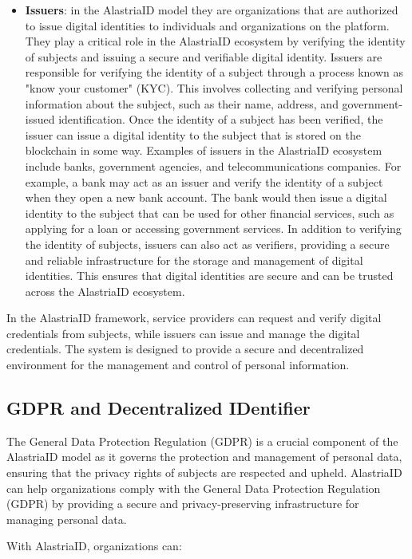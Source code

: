 \documentclass[target=mst,aauheader=]{thud}
\begin{document}
\begin{itemize}
    \item \textbf{Issuers}: in the AlastriaID model they are organizations that are authorized to issue digital identities to individuals and organizations on the platform. They play a critical role in the AlastriaID ecosystem by verifying the identity of subjects and issuing a secure and verifiable digital identity. Issuers are responsible for verifying the identity of a subject through a process known as "know your customer" (KYC). This involves collecting and verifying personal information about the subject, such as their name, address, and government-issued identification. Once the identity of a subject has been verified, the issuer can issue a digital identity to the subject that is stored on the blockchain in some way.
        Examples of issuers in the AlastriaID ecosystem include banks, government agencies, and telecommunications companies. For example, a bank may act as an issuer and verify the identity of a subject when they open a new bank account. The bank would then issue a digital identity to the subject that can be used for other financial services, such as applying for a loan or accessing government services. In addition to verifying the identity of subjects, issuers can also act as verifiers, providing a secure and reliable infrastructure for the storage and management of digital identities. This ensures that digital identities are secure and can be trusted across the AlastriaID ecosystem.
        
\end{itemize}

In the AlastriaID framework, service providers can request and verify digital credentials from subjects, while issuers can issue and manage the digital credentials. The system is designed to provide a secure and decentralized environment for the management and control of personal information.

\subsection{GDPR and Decentralized IDentifier}
The General Data Protection Regulation (GDPR) is a crucial component of the AlastriaID model as it governs the protection and management of personal data, ensuring that the privacy rights of subjects are respected and upheld.
AlastriaID can help organizations comply with the General Data Protection Regulation (GDPR) by providing a secure and privacy-preserving infrastructure for managing personal data.\par
With AlastriaID, organizations can:
\end{document}
